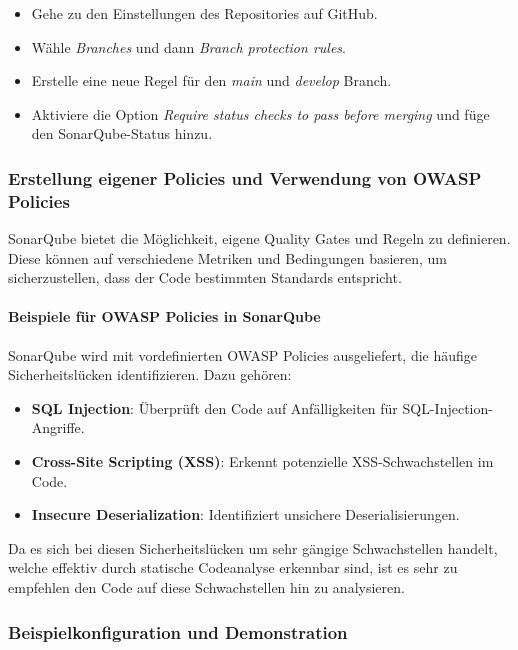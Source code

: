 \begin{itemize}
    \item Gehe zu den Einstellungen des Repositories auf GitHub.
    \item Wähle \textit{Branches} und dann \textit{Branch protection rules}.
    \item Erstelle eine neue Regel für den \textit{main} und \textit{develop} Branch.
    \item Aktiviere die Option \textit{Require status checks to pass before merging} und füge den SonarQube-Status hinzu.
\end{itemize}

\subsubsection{Erstellung eigener Policies und Verwendung von OWASP Policies}

SonarQube bietet die Möglichkeit, eigene Quality Gates und Regeln zu definieren. Diese können auf verschiedene Metriken und Bedingungen basieren, um sicherzustellen, dass der Code bestimmten Standards entspricht.

\paragraph{Beispiele für OWASP Policies in SonarQube}

SonarQube wird mit vordefinierten OWASP Policies ausgeliefert, die häufige Sicherheitslücken identifizieren. Dazu gehören:

\begin{itemize}
    \item \textbf{SQL Injection}: Überprüft den Code auf Anfälligkeiten für SQL-Injection-Angriffe.
    \item \textbf{Cross-Site Scripting (XSS)}: Erkennt potenzielle XSS-Schwachstellen im Code.
    \item \textbf{Insecure Deserialization}: Identifiziert unsichere Deserialisierungen.
\end{itemize}

Da es sich bei diesen Sicherheitslücken um sehr gängige Schwachstellen handelt, welche effektiv durch statische Codeanalyse erkennbar sind, ist es sehr zu empfehlen den Code auf diese Schwachstellen hin zu analysieren.

\subsubsection{Beispielkonfiguration und Demonstration}

